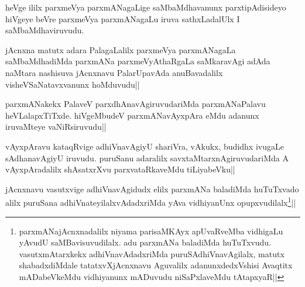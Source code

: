 
\begin{artha} 
heVge ililx parxmeVya parxmANagaLige saMbaMdhavanunx parxtipAdisideyo 
hiVgeye beVre parxmeVya parxmANagaLu iruva sathxLadalUlx I 
saMbaMdhaviruvudu. 
\end{artha}

\begin{artha} 
jAcnxna matutx adara PalagaLalilx parxmeVya parxmANagaLa 
saMbaMdhadiMda parxmANa parxmeVyAthaRgaLa saMkaravAgi adAda naMtara 
nashisuva jAcnxnavu PalarUpavAda anuBavadalilx visheVSaNatavxvanunx 
hoMduvudu||
\end{artha}

\begin{artha} 
parxmANakekx PalaveV parxdhAnavAgiruvudariMda parxmANaPalavu 
heVLalapxTiTxde. hiVgeMbudeV parxmANavAyxpAra eMdu adanunx 
iruvaMteye vaNiRsiruvudu||
\end{artha}


\begin{artha} 
vAyxpAravu kataqRvige adhiVnavAgiyU shariVra, vAkukx, budidhx ivugaLe 
sAdhanavAgiyU iruvudu. puruSanu adaralilx savxtaMtarxnAgiruvudariMda A 
vAyxpAradalilx shAsatxrXvu parxvataRkaveMdu tiLiyabeVku||
\end{artha}

\begin{artha} 
jAcnxnavu vasutxvige adhiVnavAgidudx elilx parxmANa baladiMda 
huTuTxvado alilx puruSana adhiVnateyilalxvAdadxriMda yAva vidhiyanUnx 
opupxvudilalx\footnote[1]{parxmANajAcnxnadalilx niyama parisaMKAyx 
apUvaRveMba vidhigaLu yAvudU saMBavisuvudilalx. adu parxmANa baladiMda 
huTuTxvudu. vasutxmAtarxkekx adhiVnavAdadxriMda puruSAdhiVnavAgilalx, 
matutx shabadxdiMdale tatatxvXjAcnxnavu Aguvalilx adanunxdedxVshisi 
Avaqtitx mADabeVkeMdu vidhiyanunx mADuvudu niSaPxlaveMdu tAtapxyaR||}||
\end{artha}


